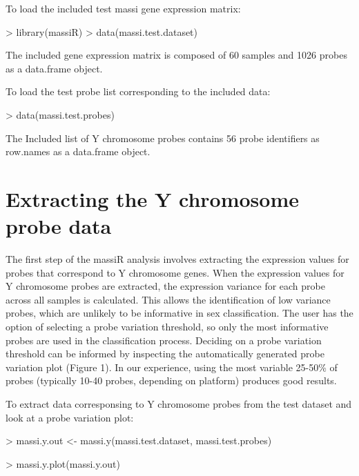 \documentclass{article}
\begin{document}
To load the included test massi gene expression matrix:
\begin{Schunk}
\begin{Sinput}
> library(massiR)
> data(massi.test.dataset)
\end{Sinput}
\end{Schunk}
The included gene expression matrix is composed of 60 samples and 1026 probes as a data.frame object.

To load the test probe list corresponding to the included data:
\begin{Schunk}
\begin{Sinput}
> data(massi.test.probes)
\end{Sinput}
\end{Schunk}
The Included list of Y chromosome probes contains 56 probe identifiers as row.names as a data.frame object.

\section{Extracting the Y chromosome probe data}
The first step of the massiR analysis involves extracting the expression values for probes that correspond to Y chromosome genes. When the expression values for Y chromosome probes are extracted, the expression variance for each probe across all samples is calculated. This allows the identification of low variance probes, which are unlikely to be informative in sex classification. The user has the option of selecting a probe variation threshold, so only the most informative probes are used in the classification process. Deciding on a probe variation threshold can be informed by inspecting the automatically generated probe variation plot (Figure 1). In our experience, using the most variable 25-50\% of probes (typically 10-40 probes, depending on platform) produces good results. 

To extract data corresponsing to Y chromosome probes from the test dataset and look at a probe variation plot:

\begin{Schunk}
\begin{Sinput}
> massi.y.out <- massi.y(massi.test.dataset, massi.test.probes)
\end{Sinput}
\end{Schunk}

\begin{Schunk}
\begin{Sinput}
> massi.y.plot(massi.y.out)
\end{Sinput}
\end{Schunk}
\end{document}
